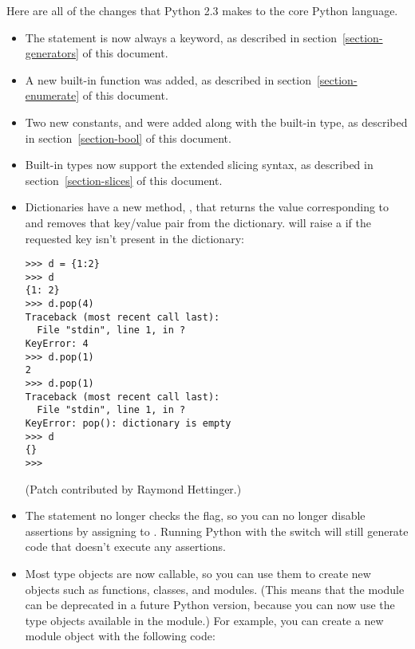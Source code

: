 \documentclass{howto}
\begin{document}
Here are all of the changes that Python 2.3 makes to the core Python
language.

\begin{itemize}
\item The  statement is now always a keyword, as
described in section~\ref{section-generators} of this document.

\item A new built-in function 
was added, as described in section~\ref{section-enumerate} of this
document.

\item Two new constants,  and  were
added along with the built-in  type, as described in
section~\ref{section-bool} of this document.

\item Built-in types now support the extended slicing syntax,
as described in section~\ref{section-slices} of this document.

\item Dictionaries have a new method, , that
returns the value corresponding to  and removes that
key/value pair from the dictionary.   will raise a
 if the requested key isn't present in the
dictionary:

\begin{verbatim}
>>> d = {1:2}
>>> d
{1: 2}
>>> d.pop(4)
Traceback (most recent call last):
  File "stdin", line 1, in ?
KeyError: 4
>>> d.pop(1)
2
>>> d.pop(1)
Traceback (most recent call last):
  File "stdin", line 1, in ?
KeyError: pop(): dictionary is empty
>>> d
{}
>>>
\end{verbatim}

(Patch contributed by Raymond Hettinger.)

\item The  statement no longer checks the 
flag, so you can no longer disable assertions by assigning to .
Running Python with the  switch will still generate
code that doesn't execute any assertions.

\item Most type objects are now callable, so you can use them
to create new objects such as functions, classes, and modules.  (This
means that the  module can be deprecated in a future
Python version, because you can now use the type objects available
in the  module.)
For example, you can create a new module object with the following code:


\end{itemize}
\end{document}
